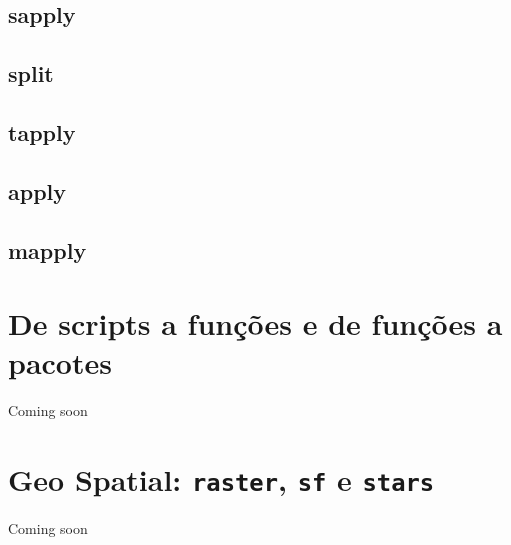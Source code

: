 \documentclass[]{book}
\begin{document}
\section{sapply}\label{sapply}

\section{split}\label{split}

\section{tapply}\label{tapply}

\section{apply}\label{apply}

\section{mapply}\label{mapply}

\chapter{De scripts a funções e de funções a pacotes}\label{fx}

Coming soon

\chapter{\texorpdfstring{Geo Spatial: \texttt{raster}, \texttt{sf} e
\texttt{stars}}{Geo Spatial: raster, sf e stars}}\label{geo}

Coming soon


\end{document}
